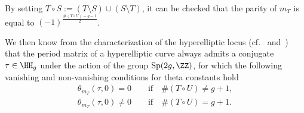 By setting $T\circ S:= (T\setminus S)\cup (S\setminus T)$, it can be checked that the parity of $m_T$ is equal to $(-1)^{\frac{\#(T\circ U)-g-1}{2}}$.

We then know from the characterization of the hyperelliptic locus (cf.~\cite{Th} and~\cite{mu}) that the period matrix of a hyperelliptic curve always admits a conjugate $\tau \in \HH_g$ under the action of the group ${\rm Sp}(2g, \ZZ)$, for which the following vanishing and non-vanishing conditions for theta constants hold
\begin{gather}
\theta_{m_T} (\tau,0)=0 \qquad \text{if} \quad \#(T\circ U)\neq g+1, \label{vanishing}\\
\theta_{m_T} (\tau,0) \neq 0 \qquad \text{if} \quad \#(T\circ U) = g+1. \label{nonvanishing}
\end{gather}
